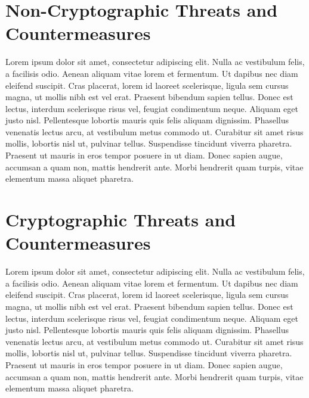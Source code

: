 \documentclass[9pt]{extarticle}
\begin{document}
\section{Non-Cryptographic Threats and Countermeasures}
Lorem ipsum dolor sit amet, consectetur adipiscing elit. Nulla ac vestibulum felis, a facilisis odio. Aenean aliquam vitae lorem et fermentum. Ut dapibus nec diam eleifend suscipit. Cras placerat, lorem id laoreet scelerisque, ligula sem cursus magna, ut mollis nibh est vel erat. Praesent bibendum sapien tellus. Donec est lectus, interdum scelerisque risus vel, feugiat condimentum neque. Aliquam eget justo nisl. Pellentesque lobortis mauris quis felis aliquam dignissim. Phasellus venenatis lectus arcu, at vestibulum metus commodo ut. Curabitur sit amet risus mollis, lobortis nisl ut, pulvinar tellus. Suspendisse tincidunt viverra pharetra. Praesent ut mauris in eros tempor posuere in ut diam. Donec sapien augue, accumsan a quam non, mattis hendrerit ante. Morbi hendrerit quam turpis, vitae elementum massa aliquet pharetra. 

\section{Cryptographic Threats and Countermeasures}
Lorem ipsum dolor sit amet, consectetur adipiscing elit. Nulla ac vestibulum felis, a facilisis odio. Aenean aliquam vitae lorem et fermentum. Ut dapibus nec diam eleifend suscipit. Cras placerat, lorem id laoreet scelerisque, ligula sem cursus magna, ut mollis nibh est vel erat. Praesent bibendum sapien tellus. Donec est lectus, interdum scelerisque risus vel, feugiat condimentum neque. Aliquam eget justo nisl. Pellentesque lobortis mauris quis felis aliquam dignissim. Phasellus venenatis lectus arcu, at vestibulum metus commodo ut. Curabitur sit amet risus mollis, lobortis nisl ut, pulvinar tellus. Suspendisse tincidunt viverra pharetra. Praesent ut mauris in eros tempor posuere in ut diam. Donec sapien augue, accumsan a quam non, mattis hendrerit ante. Morbi hendrerit quam turpis, vitae elementum massa aliquet pharetra. 

\newpage
\printbibliography
\end{document}
